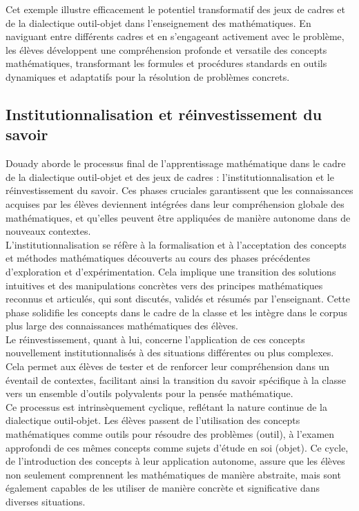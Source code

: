 Cet exemple illustre efficacement le potentiel transformatif des jeux de cadres et de la dialectique outil-objet dans l'enseignement des mathématiques.
En naviguant entre différents cadres et en s'engageant activement avec le problème,
les élèves développent une compréhension profonde et versatile des concepts mathématiques,
transformant les formules et procédures standards en outils dynamiques et adaptatifs pour la résolution de problèmes concrets.

\subsection{Institutionnalisation et réinvestissement du savoir}

Douady aborde le processus final de l'apprentissage mathématique dans le cadre de la dialectique outil-objet et des jeux de cadres :
l'institutionnalisation et le réinvestissement du savoir.
Ces phases cruciales garantissent que les connaissances acquises par les élèves deviennent intégrées dans leur compréhension globale des mathématiques,
et qu'elles peuvent être appliquées de manière autonome dans de nouveaux contextes.\\

L'institutionnalisation se réfère à la formalisation et à l'acceptation des concepts et méthodes mathématiques découverts au cours des phases précédentes d'exploration et d'expérimentation.
Cela implique une transition des solutions intuitives et des manipulations concrètes vers des principes mathématiques reconnus et articulés,
qui sont discutés,
validés et résumés par l'enseignant.
Cette phase solidifie les concepts dans le cadre de la classe et les intègre dans le corpus plus large des connaissances mathématiques des élèves.\\

Le réinvestissement,
quant à lui,
concerne l'application de ces concepts nouvellement institutionnalisés à des situations différentes ou plus complexes.
Cela permet aux élèves de tester et de renforcer leur compréhension dans un éventail de contextes,
facilitant ainsi la transition du savoir spécifique à la classe vers un ensemble d'outils polyvalents pour la pensée mathématique.\\

Ce processus est intrinsèquement cyclique,
reflétant la nature continue de la dialectique outil-objet.
Les élèves passent de l'utilisation des concepts mathématiques comme outils pour résoudre des problèmes (outil),
à l'examen approfondi de ces mêmes concepts comme sujets d'étude en soi (objet).
Ce cycle,
de l'introduction des concepts à leur application autonome,
assure que les élèves non seulement comprennent les mathématiques de manière abstraite,
mais sont également capables de les utiliser de manière concrète et significative dans diverses situations.

